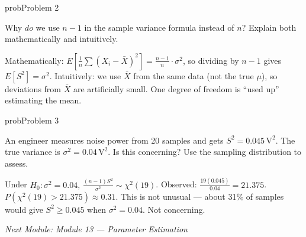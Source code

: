 \begin{PSbox}[unbreakable]{prob}{Problem 2}

Why $do$ we use $n-1$ in the sample variance formula instead of $n$? Explain both mathematically and intuitively.

\PSsolution{} Mathematically: $E\left[\frac{1}{n}\sum (X_{i}-\bar{X})^{2}\right] = \frac{n-1}{n} \cdot \sigma^{2}$, so dividing by $n-1$ gives $E[S^{2}] = \sigma^{2}$. Intuitively: we use $\bar{X}$ from the same data (not the true $\mu$), so deviations from $\bar{X}$ are artificially small. One degree of freedom is ``used up'' estimating the mean.

\end{PSbox}

\begin{PSbox}[unbreakable]{prob}{Problem 3}

An engineer measures noise power from 20 samples and gets $S^{2} = 0.045\,\mathrm{V}^{2}$. The true variance is $\sigma^{2} = 0.04\,\mathrm{V}^{2}$. Is this concerning? Use the sampling distribution to assess.

\PSsolution{} Under $H_{0}: \sigma^{2} = 0.04,\, \frac{(n-1)S^{2}}{\sigma^{2}} \sim \chi^{2}(19)$. Observed: $\frac{19(0.045)}{0.04} = 21.375$. $P(\chi^{2}(19) > 21.375) \approx 0.31$. This is not unusual — about 31\% of samples would give $S^{2} \ge 0.045$ when $\sigma^{2} = 0.04$. Not concerning.

\emph{Next Module: {Module 13 — Parameter Estimation}}

\end{PSbox}

